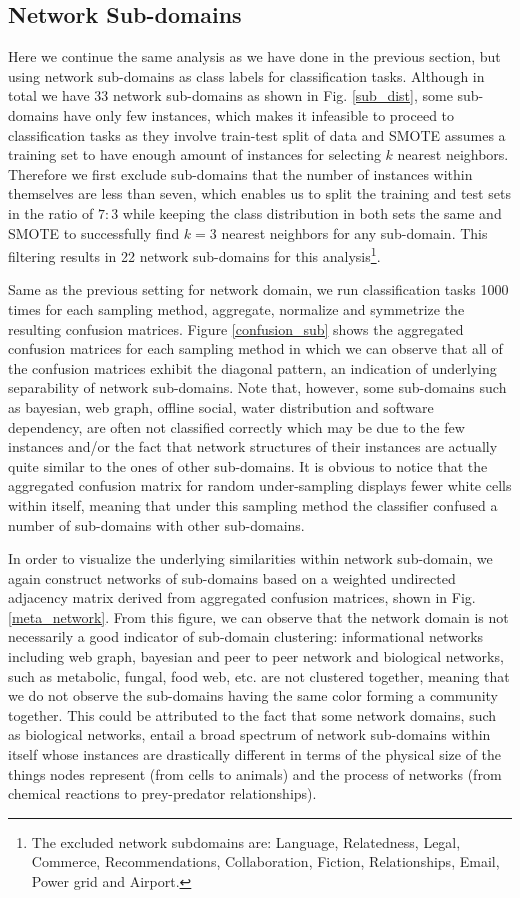 \subsection{Network Sub-domains}
Here we continue the same analysis as we have done in the previous section, but using network sub-domains as class labels for classification tasks.
Although in total we have 33 network sub-domains as shown in Fig. \ref{sub_dist}, some sub-domains have only few instances, which makes it infeasible to proceed to classification tasks as they involve train-test split of data and SMOTE assumes a training set to have enough amount of instances for selecting $k$ nearest neighbors. Therefore we first exclude sub-domains that the number of instances within themselves are less than seven, which enables us to split the training and test sets in the ratio of $7:3$ while keeping the class distribution in both sets the same and SMOTE to successfully find $k=3$ nearest neighbors for any sub-domain. This filtering results in 22 network sub-domains for this analysis\footnote{The excluded network subdomains are: Language, Relatedness, Legal, Commerce, Recommendations, Collaboration, Fiction, Relationships, Email, Power grid and Airport.}. 

Same as the previous setting for network domain, we run classification tasks 1000 times for each sampling method, aggregate, normalize and symmetrize the resulting confusion matrices. Figure \ref{confusion_sub} shows the aggregated confusion matrices for each sampling method in which we can observe that all of the confusion matrices exhibit the diagonal pattern, an indication of underlying separability of network sub-domains. Note that, however, some sub-domains such as bayesian, web graph, offline social, water distribution and software dependency, are often not classified correctly which may be due to the few instances and/or the fact that network structures of their instances are actually quite similar to the ones of other sub-domains. It is obvious to notice that the aggregated confusion matrix for random under-sampling displays fewer white cells within itself, meaning that under this sampling method the classifier confused a number of sub-domains with other sub-domains.

In order to visualize the underlying similarities within network sub-domain, we again construct networks of sub-domains based on a weighted undirected adjacency matrix derived from aggregated confusion matrices, shown in Fig.\ref{meta_network}. From this figure, we can observe that the network domain is not necessarily a good indicator of sub-domain clustering: informational networks including web graph, bayesian and peer to peer network and biological networks, such as metabolic, fungal, food web, etc. are not clustered together, meaning that we do not observe the sub-domains having the same color forming a community together. This could be attributed to the fact that some network domains, such as biological networks, entail a broad spectrum of network sub-domains within itself whose instances are drastically different in terms of the physical size of the things nodes represent (from cells to animals) and the process of networks (from chemical reactions to prey-predator relationships). 

